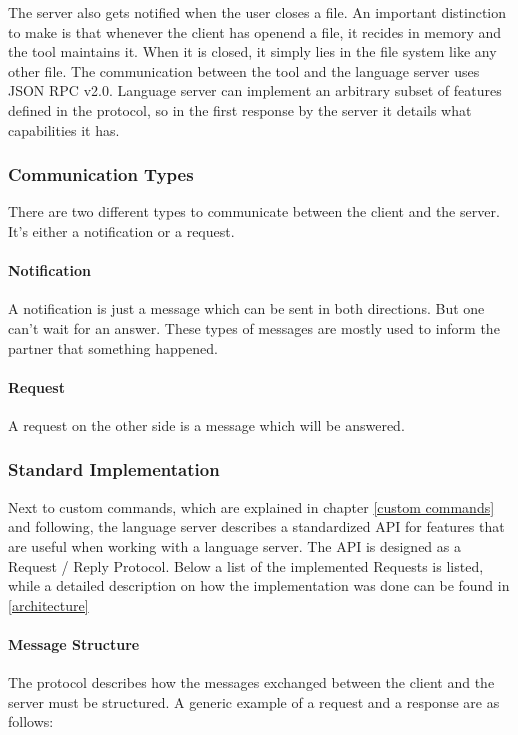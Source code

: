 The server also gets notified when the user closes a file. An important distinction to make is that whenever the client has openend a file, it recides in memory and the tool maintains it. When it is closed, it simply lies in the file system like any other file. \newline
The communication between the tool and the language server uses JSON RPC v2.0. Language server can implement an arbitrary subset of features defined in the protocol, so in the first response by the server it details what capabilities it has. \newline


\subsubsection{Communication Types}
There are two different types to communicate between the client and the server. It's either a notification or a request. 

\paragraph{Notification}
A notification is just a message which can be sent in both directions. But one can't wait for an answer. These types of messages are mostly used to inform the partner that something happened. 

\paragraph{Request}
A request on the other side is a message which will be answered.  

\subsubsection{Standard Implementation}
Next to custom commands, which are explained in chapter \ref{custom commands} and following, the language server describes a standardized API\cite{protMaster} for features that are useful when working with a language server. The API is designed as a Request / Reply Protocol. Below a list of the implemented Requests is listed, while a detailed description on how the implementation was done can be found in \ref{architecture}\newline

\paragraph{Message Structure}
The protocol describes how the messages exchanged between the client and the server must be structured. A generic example of a request and a response are as follows:

